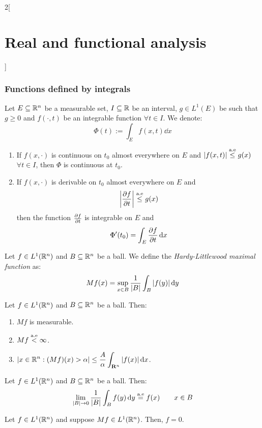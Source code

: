 \documentclass[../../../main_math.tex]{subfiles}
\begin{document}
\begin{multicols}{2}[\section{Real and functional analysis}]
  \subsubsection{Functions defined by integrals}
  \begin{theorem}
    Let $E\subseteq\mathbb{R}^n$ be a measurable set, $I\subseteq \mathbb{R}$ be an interval, $g\in L^1(E)$ be such that $g\geq 0$ and $f(\cdot, t)$ be an integrable function $\forall t\in I$. We denote: $$\Phi(t):=\int_Ef(x,t)\dd{x}$$
    \begin{enumerate}
      \item If $f(x,\cdot)$ is continuous on $t_0$ almost everywhere on $E$ and $\abs{f(x,t)}\overset{\text{a.e}}{\leq} g(x)$ $\forall t\in I$, then $\Phi$ is continuous at $t_0$.
      \item If $f(x,\cdot)$ is derivable on $t_0$ almost everywhere on $E$ and $$\abs{\pdv{f}{t}(x,t)}\overset{\text{a.e}}{\leq} g(x)$$ then the function $\pdv{f}{t}(x,\cdot)$ is integrable on $E$ and $$\Phi'(t_0)=\int_E\pdv{f}{t}(x,t_0)\dd{x}$$
    \end{enumerate}
  \end{theorem}
  \begin{definition}
    Let $f\in L^1(\mathbb{R}^n)$ and $B\subseteq \mathbb{R}^n$ be a ball. We define the \emph{Hardy-Littlewood maximal function} as: $$Mf(x)=\sup_{x\in B}\frac{1}{\m{B}}\int_B\abs{f(y)}\dd{y}$$
  \end{definition}
  \begin{theorem}
    Let $f\in L^1(\mathbb{R}^n)$ and $B\subseteq \mathbb{R}^n$ be a ball. Then:
    \begin{enumerate}
      \item $Mf$ is measurable.
      \item $Mf\overset{\text{a.e}}{<}\infty$.
      \item $\displaystyle\m{x\in\RR^n : (Mf)(x) > \alpha} \leq \frac{A}{\alpha}\int_{\mathbf{R}^n} |f(x)|\dd{x}$.
    \end{enumerate}
  \end{theorem}
  \begin{theorem}
    Let $f\in L^1(\mathbb{R}^n)$ and $B\subseteq \mathbb{R}^n$ be a ball. Then: $$\lim_{\m{B}\to 0}\frac{1}{\m{B}}\int_Bf(y)\dd{y} \almoste{=} f(x) \qquad x\in  B$$
  \end{theorem}
  \begin{proposition}
    Let $f\in L^1(\mathbb{R}^n)$ and suppose $Mf\in L^1(\mathbb{R}^n)$. Then, $f=0$.
  \end{proposition}

\end{multicols}
\end{document}
